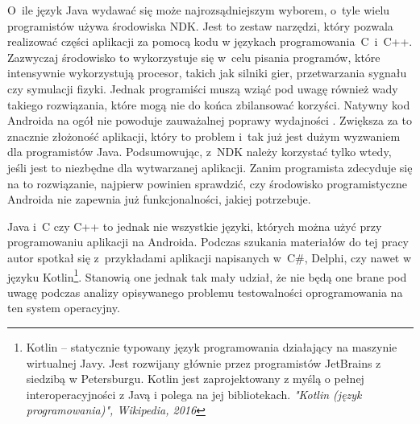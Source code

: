 O~ile język Java wydawać się może najrozsądniejszym wyborem, o~tyle wielu programistów używa środowiska NDK. Jest to zestaw narzędzi, który pozwala realizować części aplikacji za pomocą kodu w językach programowania~C~i~C++. Zazwyczaj środowisko to wykorzystuje się w~celu pisania programów, które intensywnie wykorzystują procesor, takich jak silniki gier, przetwarzania sygnału czy symulacji fizyki. Jednak programiści muszą wziąć pod uwagę również wady takiego rozwiązania, które mogą nie do końca zbilansować korzyści. Natywny kod Androida na ogół nie powoduje zauważalnej poprawy wydajności \cite{website:java:wydajnosc}. Zwiększa za to znacznie złożoność aplikacji, który to problem i~tak już jest dużym wyzwaniem dla programistów Java. Podsumowując, z~NDK należy korzystać tylko wtedy, jeśli jest to niezbędne dla wytwarzanej aplikacji. Zanim programista zdecyduje się na to rozwiązanie, najpierw powinien sprawdzić, czy środowisko programistyczne Androida nie zapewnia już funkcjonalności, jakiej potrzebuje.

Java i~C czy C++ to jednak nie wszystkie języki, których można użyć przy programowaniu aplikacji na Androida. Podczas szukania materiałów do tej pracy autor spotkał się z~przykładami aplikacji napisanych w~C\#, Delphi, czy nawet w języku Kotlin\footnote{Kotlin – statycznie typowany język programowania działający na maszynie wirtualnej Javy. Jest rozwijany głównie przez programistów JetBrains z siedzibą w Petersburgu. Kotlin jest zaprojektowany z myślą o pełnej interoperacyjności z Javą i polega na jej bibliotekach. \textit{"Kotlin (język programowania)", Wikipedia, 2016}}. Stanowią one jednak tak mały udział, że nie będą one brane pod uwagę podczas analizy opisywanego problemu testowalności oprogramowania na ten system operacyjny.





